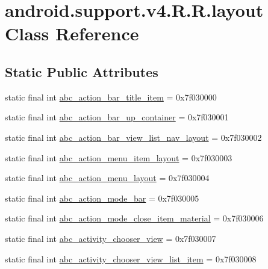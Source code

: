 \hypertarget{classandroid_1_1support_1_1v4_1_1_r_1_1layout}{
\section{android.support.v4.R.R.layout Class Reference}
\label{classandroid_1_1support_1_1v4_1_1_r_1_1layout}
}
\subsection*{Static Public Attributes}
\begin{CompactItemize}
\item 
static final int \hyperlink{classandroid_1_1support_1_1v4_1_1_r_1_1layout_827fbb875b82fc72d3b59f4a4fc23036}{abc\_\-action\_\-bar\_\-title\_\-item} = 0x7f030000
\item 
static final int \hyperlink{classandroid_1_1support_1_1v4_1_1_r_1_1layout_1fa571e8372ba28a7657cf3be9885c8e}{abc\_\-action\_\-bar\_\-up\_\-container} = 0x7f030001
\item 
static final int \hyperlink{classandroid_1_1support_1_1v4_1_1_r_1_1layout_04f0942c1782bfa9e285d892bba71c0d}{abc\_\-action\_\-bar\_\-view\_\-list\_\-nav\_\-layout} = 0x7f030002
\item 
static final int \hyperlink{classandroid_1_1support_1_1v4_1_1_r_1_1layout_995c4bf6fc5e0c90d9ca34d38c900669}{abc\_\-action\_\-menu\_\-item\_\-layout} = 0x7f030003
\item 
static final int \hyperlink{classandroid_1_1support_1_1v4_1_1_r_1_1layout_6bfa04f7b25a71c1d4ddb43572600739}{abc\_\-action\_\-menu\_\-layout} = 0x7f030004
\item 
static final int \hyperlink{classandroid_1_1support_1_1v4_1_1_r_1_1layout_fafae02860aa04a76847019d1ee97d37}{abc\_\-action\_\-mode\_\-bar} = 0x7f030005
\item 
static final int \hyperlink{classandroid_1_1support_1_1v4_1_1_r_1_1layout_6a302aa2e3dd50a1b66e52636d08d626}{abc\_\-action\_\-mode\_\-close\_\-item\_\-material} = 0x7f030006
\item 
static final int \hyperlink{classandroid_1_1support_1_1v4_1_1_r_1_1layout_6f5831ffa04c3021d77324b75ef6a82a}{abc\_\-activity\_\-chooser\_\-view} = 0x7f030007
\item 
static final int \hyperlink{classandroid_1_1support_1_1v4_1_1_r_1_1layout_c5831cd2717359f013b407240ed625bf}{abc\_\-activity\_\-chooser\_\-view\_\-list\_\-item} = 0x7f030008
\item 

\end{CompactItemize}
